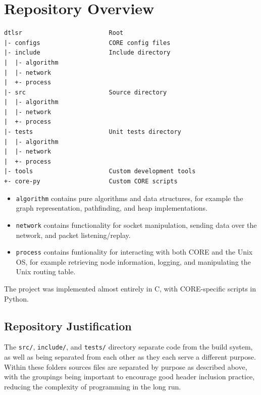 \documentclass[withindex,glossary,openany]{cam-thesis}
\begin{document}
\section{Repository Overview}
\begin{minipage}{1\textwidth} \centering
\begin{lstlisting}[label=repository, frame=tb]
dtlsr                        Root
|- configs                   CORE config files
|- include                   Include directory
|  |- algorithm
|  |- network
|  +- process
|- src                       Source directory
|  |- algorithm
|  |- network
|  +- process
|- tests                     Unit tests directory
|  |- algorithm
|  |- network
|  +- process
|- tools                     Custom development tools
+- core-py                   Custom CORE scripts
\end{lstlisting}
\end{minipage}

\begin{itemize}
	\item
	\texttt{algorithm} contains pure algorithms and data structures, for example the graph representation, pathfinding, and heap implementations.

	\item
	\texttt{network} contains functionality for socket manipulation, sending data over the network, and packet listening/replay.
	
	\item
	\texttt{process} contains funtionality for interacting with both CORE and the Unix OS, for example retrieving node information, logging, and manipulating the Unix routing table.
\end{itemize}

The project was implemented almost entirely in C, with CORE-specific scripts in Python.

\subsection{Repository Justification}

The \texttt{src/}, \texttt{include/}, and \texttt{tests/} directory separate code from the build system, as well as being separated from each other as they each serve a different purpose. Within these folders sources files are separated by purpose as described above, with the groupings being important to encourage good header inclusion practice, reducing the complexity of programming in the long run.
\end{document}
